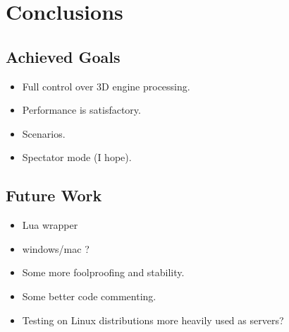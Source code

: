 
\chapter{Conclusions}

\section{Achieved Goals}
\begin{itemize}
\item Full control over 3D engine processing.
\item Performance is satisfactory.
\item Scenarios.
\item Spectator mode (I hope). 
\end{itemize}

\section{Future Work}
\begin{itemize}
\item Lua wrapper
\item windows/mac ?
\item Some more foolproofing and stability.
\item Some better code commenting.
\item Testing on Linux distributions more heavily used as servers? 
\end{itemize}